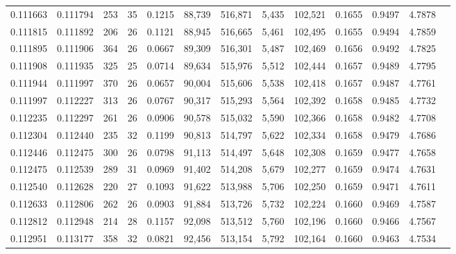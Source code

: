 \begin{tabular}{rrrrrrrrrrrrr}
0.111663 & 0.111794 &   253 &  35 &                                     0.1215 &  88,739 & 516,871 &   5,435 & 102,521 & 0.1655 & 0.9497 & 4.7878 \\
0.111815 & 0.111892 &   206 &  26 &                                     0.1121 &  88,945 & 516,665 &   5,461 & 102,495 & 0.1655 & 0.9494 & 4.7859 \\
0.111895 & 0.111906 &   364 &  26 &                                     0.0667 &  89,309 & 516,301 &   5,487 & 102,469 & 0.1656 & 0.9492 & 4.7825 \\
0.111908 & 0.111935 &   325 &  25 &                                     0.0714 &  89,634 & 515,976 &   5,512 & 102,444 & 0.1657 & 0.9489 & 4.7795 \\
0.111944 & 0.111997 &   370 &  26 &                                     0.0657 &  90,004 & 515,606 &   5,538 & 102,418 & 0.1657 & 0.9487 & 4.7761 \\
0.111997 & 0.112227 &   313 &  26 &                                     0.0767 &  90,317 & 515,293 &   5,564 & 102,392 & 0.1658 & 0.9485 & 4.7732 \\
0.112235 & 0.112297 &   261 &  26 &                                     0.0906 &  90,578 & 515,032 &   5,590 & 102,366 & 0.1658 & 0.9482 & 4.7708 \\
0.112304 & 0.112440 &   235 &  32 &                                     0.1199 &  90,813 & 514,797 &   5,622 & 102,334 & 0.1658 & 0.9479 & 4.7686 \\
0.112446 & 0.112475 &   300 &  26 &                                     0.0798 &  91,113 & 514,497 &   5,648 & 102,308 & 0.1659 & 0.9477 & 4.7658 \\
0.112475 & 0.112539 &   289 &  31 &                                     0.0969 &  91,402 & 514,208 &   5,679 & 102,277 & 0.1659 & 0.9474 & 4.7631 \\
0.112540 & 0.112628 &   220 &  27 &                                     0.1093 &  91,622 & 513,988 &   5,706 & 102,250 & 0.1659 & 0.9471 & 4.7611 \\
0.112633 & 0.112806 &   262 &  26 &                                     0.0903 &  91,884 & 513,726 &   5,732 & 102,224 & 0.1660 & 0.9469 & 4.7587 \\
0.112812 & 0.112948 &   214 &  28 &                                     0.1157 &  92,098 & 513,512 &   5,760 & 102,196 & 0.1660 & 0.9466 & 4.7567 \\
0.112951 & 0.113177 &   358 &  32 &                                     0.0821 &  92,456 & 513,154 &   5,792 & 102,164 & 0.1660 & 0.9463 & 4.7534 \\

\end{tabular}
